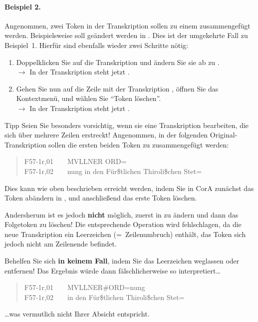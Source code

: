 \documentclass[11pt,a4paper,parskip=half]{scrartcl}
\begin{document}
\paragraph{Beispiel 2.}  Angenommen, zwei Token in der Transkription
sollen zu einem zusammengefügt werden.  Beispielsweise soll
 geändert werden in .  Dies ist der
umgekehrte Fall zu Beispiel~1.  Hierfür sind ebenfalls wieder zwei
Schritte nötig:
\begin{enumerate}
\item Doppelklicken Sie auf die Transkription  und ändern
  Sie sie ab zu .\\$\to$ In der Transkription steht
  jetzt .
\item Gehen Sie nun auf die Zeile mit der Transkription ,
  öffnen Sie das Kontextmenü, und wählen Sie "`Token löschen"'.\\$\to$
  In der Transkription steht jetzt .
\end{enumerate}

\begin{infobox}{Tipp}
  Seien Sie besonders vorsichtig, wenn sie eine Transkription
  bearbeiten, die sich über mehrere Zeilen erstreckt!  Angenommen, in
  der folgenden Original-Transkription sollen die ersten beiden Token
  zu  zusammengefügt werden:

  \begin{quote}\ttfamily\small
    F57-1r,01~~~~MVLLNER ORD=\\
    F57-1r,02~~~~nung in den Für\$tlichen Thiroli\$chen Stet=
  \end{quote}

  Dies kann wie oben beschrieben erreicht werden, indem Sie in CorA
  zunächst das Token  abändern in
  , und anschließend das erste Token
   löschen.

  Andersherum ist es jedoch \textbf{nicht} möglich, zuerst
   in  zu ändern und dann das
  Folgetoken zu löschen!  Die entsprechende Operation wird
  fehlschlagen, da die neue Transkription ein Leerzeichen
  (=~Zeilenumbruch) enthält, das Token  sich jedoch
  nicht am Zeilenende befindet.

  Behelfen Sie sich \textbf{in keinem Fall}, indem Sie das Leerzeichen
  weglassen oder entfernen!  Das Ergebnis würde dann fälschlicherweise
  so interpretiert\ldots{}

  \begin{quote}\ttfamily\small
    F57-1r,01~~~~MVLLNER\#ORD=nung\\
    F57-1r,02~~~~in den Für\$tlichen Thiroli\$chen Stet=
  \end{quote}

  \ldots{}was vermutlich nicht Ihrer Absicht entspricht.
\end{infobox}
\end{document}
